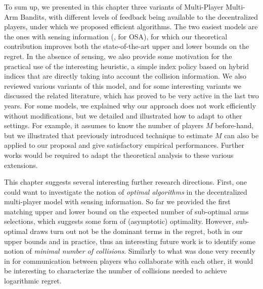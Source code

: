 To sum up, we presented in this chapter three variants of Multi-Player Multi-Arm Bandits,
with different levels of feedback being available to the decentralized players, under which we proposed efficient algorithms.
The two easiest models are the ones with sensing information (\ie, for OSA), for which our theoretical contribution improves both the state-of-the-art upper and lower bounds on the regret. In the absence of sensing, we also provide some motivation for the practical use of the interesting \Selfish{} heuristic, a simple index policy based on hybrid indices that are directly taking  into account the collision information.
%
We also reviewed various variants of this model, and for some interesting variants we discussed the related literature, which has proved to be very active in the last two years. For some models, we explained why our approach does not work efficiently without modifications, but we detailed and illustrated how to adapt \MCTopM{} to other settings.
For example, it assumes to know the number of players $M$ before-hand, but we illustrated that previously introduced technique to estimate $M$ can also be applied to our proposal and give satisfactory empirical performances.
Further works would be required to adapt the theoretical analysis to these various extensions.

This chapter suggests several interesting further research directions.
First, one could want to investigate the notion of \emph{optimal algorithms} in the decentralized multi-player model with sensing information. So far we provided the first matching upper and lower bound on the expected number of sub-optimal arms selections, which suggests some form of (asymptotic) optimality. However, sub-optimal draws turn out not be the dominant terms in the regret, both in our upper bounds and in practice, thus an interesting future work is to identify some notion of \emph{minimal number of collisions}.
Similarly to what was done very recently in \cite{wang2019distributed} for communication between players who collaborate with each other, it would be interesting to characterize the number of collisions needed to achieve logarithmic regret.



